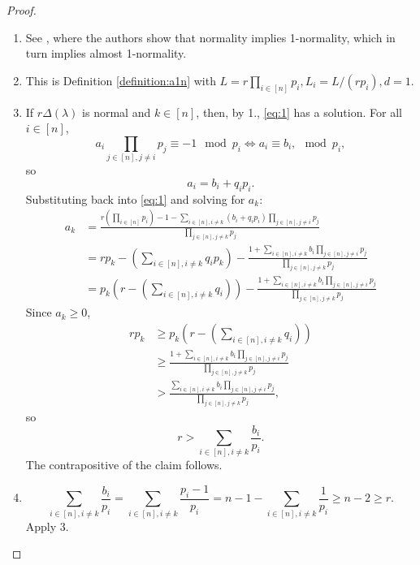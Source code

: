 \documentclass[a4paper,11pt]{amsart}
\theoremstyle{plain}
\theoremstyle{definition}
\theoremstyle{remark}
\begin{document}
\begin{proof}
    \begin{enumerate}[1.]
        \item See \cite{BrunsGubeladze:1999}, where the authors show that normality implies 1-normality, which in turn implies almost 1-normality.
        \item This is Definition \ref{definition:a1n} with $L = r\prod_{i \in [n]} p_i, L_i = L/(rp_i), d = 1$.
        \item If $r\Delta(\lambda)$ is normal and $k \in [n]$, then, by 1., \eqref{eq:1} has a solution. For all $i \in [n]$,
        \[
        a_i \prod_{j \in [n], j \neq i} p_j \equiv -1 \mod p_i \iff a_i \equiv b_i, \mod p_i,
        \]
        so
        \[
        a_i = b_i + q_ip_i.
        \]
        Substituting back into \eqref{eq:1} and solving for $a_k$:
        \begin{align*}
            a_k &= \frac{r\left ( \prod_{i \in [n]} p_i \right ) - 1 - \sum_{i \in [n], i \neq k} (b_i + q_ip_i) \prod_{j \in [n], j \neq i} p_j}{\prod_{j \in [n], j \neq k} p_j} \\
            &= rp_k - \left (\sum_{i \in [n], i \neq k}q_ip_k \right ) - \frac{1 + \sum_{i \in [n], i \neq k} b_i \prod_{j \in [n], j \neq i} p_j}{\prod_{j \in [n], j \neq k} p_j} \\
            &= p_k\left(r - \left (\sum_{i \in [n], i \neq k}q_i \right )\right) - \frac{1 + \sum_{i \in [n], i \neq k} b_i \prod_{j \in [n], j \neq i} p_j}{\prod_{j \in [n], j \neq k} p_j}
        \end{align*}
        Since $a_k \geq 0$,
        \begin{align*}
            rp_k &\geq p_k\left(r - \left (\sum_{i \in [n], i \neq k}q_i \right )\right) \\
            &\geq\frac{1 + \sum_{i \in [n], i \neq k} b_i \prod_{j \in [n], j \neq i} p_j}{\prod_{j \in [n], j \neq k} p_j} \\
            &> \frac{\sum_{i \in [n], i \neq k} b_i \prod_{j \in [n], j \neq i} p_j}{\prod_{j \in [n], j \neq k} p_j},
        \end{align*}
        so
        \[
        r > \sum_{i \in [n], i \neq k} \frac{b_i}{p_i}.
        \]
        The contrapositive of the claim follows.
        \item \[
        \sum_{i \in [n], i \neq k} \frac{b_i}{p_i} = \sum_{i \in [n], i \neq k} \frac{p_i - 1}{p_i} = n - 1 - \sum_{i \in [n], i \neq k} \frac{1}{p_i} \geq n - 2 \geq r.
        \]
        Apply 3.
    \end{enumerate}
\end{proof}
\end{document}
